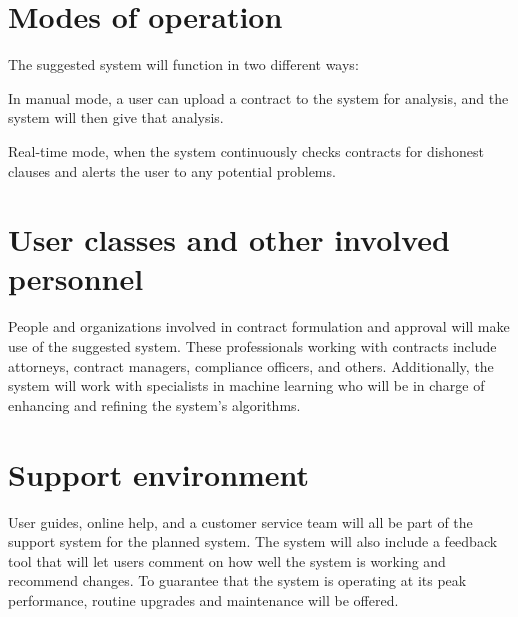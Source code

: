 \section{Modes of operation \label{Section::Modes of operation proposed}}

The suggested system will function in two different ways:

In manual mode, a user can upload a contract to the system for analysis, and the system will then give that analysis.

Real-time mode, when the system continuously checks contracts for dishonest clauses and alerts the user to any potential problems.


\section{User classes and other involved personnel \label{Section::User Classes and other involved personnel proposed}}
People and organizations involved in contract formulation and approval will make use of the suggested system. These professionals working with contracts include attorneys, contract managers, compliance officers, and others. Additionally, the system will work with specialists in machine learning who will be in charge of enhancing and refining the system's algorithms.


\section{Support environment \label{Section::Support Environment proposed}}
User guides, online help, and a customer service team will all be part of the support system for the planned system. The system will also include a feedback tool that will let users comment on how well the system is working and recommend changes. To guarantee that the system is operating at its peak performance, routine upgrades and maintenance will be offered.

